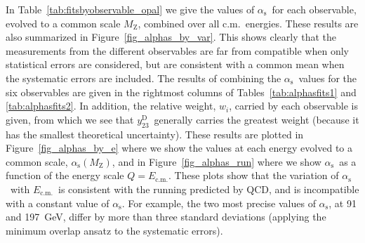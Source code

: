 \documentclass[12pt,a4paper,twoside]{article}
\newcommand{\as}     {\ensuremath{\alpha_{\mathrm{s}}}}
\newcommand{\asmz}   {\ensuremath{\alpha_{\mathrm{s}}(\mz)}}
\newcommand{\mz}     {\ensuremath{M_{\mathrm{Z}}}}
\newcommand{\ecm}   {\ensuremath{E_{\mathrm{c.m.}}}}
\newcommand{\ytwothree}   {\ensuremath{y^{\mathrm{D}}_{23}}}
\newcommand{\qcd}{\mbox{QCD}}
\begin{document}
In Table~\ref{tab:fitsbyobservable_opal} we give the 
values of \as\ for each observable, evolved to a common 
scale \mz, combined over all 
c.m.\ energies.  These results are also summarized in
Figure~\ref{fig_alphas_by_var}.   This shows clearly that the
measurements  from the different observables are far 
from compatible when only statistical errors are
considered, but are consistent with a common mean when 
the systematic errors are included.   
The results of combining the \as\ values for the six observables
are given in the rightmost columns
of Tables~\ref{tab:alphasfits1} and \ref{tab:alphasfits2}.  
In addition, the relative weight, $w_i$,
carried by each observable is given, from which we see that
\ytwothree\ generally carries the greatest weight
(because it has the smallest theoretical uncertainty).
These results are plotted in Figure~\ref{fig_alphas_by_e} where we show the values
at each energy evolved to a common scale, \asmz, and in
Figure~\ref{fig_alphas_run} where we show \as\ as a function of 
the energy scale $Q=\ecm$.
These plots show that the variation of \as\ with \ecm\ is 
consistent with the running predicted by \qcd, and is
incompatible with a constant value of \as.
For example, the two most precise 
values of \as, at 91 and 197~GeV, differ by more than
three standard deviations (applying the minimum overlap ansatz 
to the systematic errors).  
\end{document}
